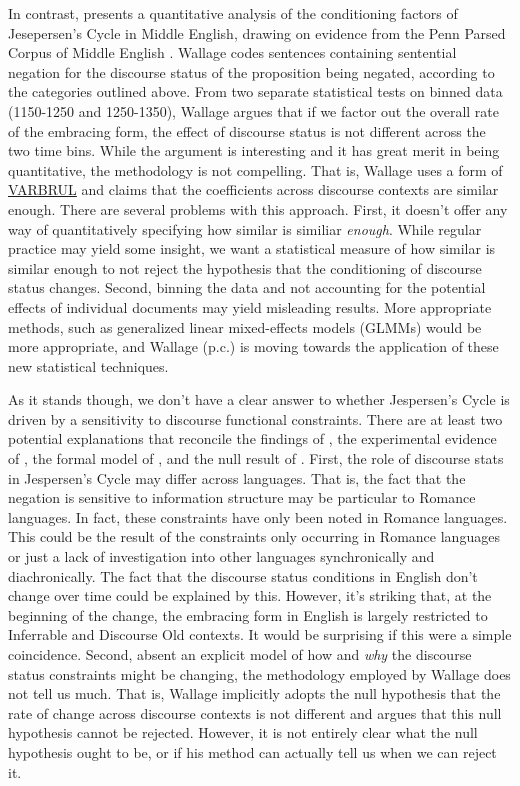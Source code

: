 In contrast, \cite{wallage2013} presents a quantitative analysis of the conditioning factors of Jesepersen's Cycle in Middle English, drawing on evidence from the Penn Parsed Corpus of Middle English \citep{ppcme2}. Wallage codes sentences containing sentential negation for the discourse status of the proposition being negated, according to the categories outlined above. From two separate statistical tests on binned data (1150-1250 and 1250-1350), Wallage argues that if we factor out the overall rate of the embracing form, the effect of discourse status is not different across the two time bins. While the argument is interesting and it has great merit in being quantitative, the methodology is not compelling. That is, Wallage uses a form of \href{http://en.wikipedia.org/wiki/Variable_rules_analysis}{VARBRUL} and claims that the coefficients across discourse contexts are similar enough. There are several problems with this approach. First, it doesn't offer any way of quantitatively specifying how similar is 
similiar \emph{enough}. While regular practice may yield some insight, we want a statistical measure of how similar is similar enough to not reject the hypothesis that the conditioning of discourse status changes. Second, binning the data and not accounting for the potential effects of individual documents may yield misleading results. More appropriate methods, such as generalized linear mixed-effects models (GLMMs) would be more appropriate, and Wallage (p.c.) is moving towards the application of these new statistical techniques.

As it stands though, we don't have a clear answer to whether Jespersen's Cycle is driven by a sensitivity to discourse functional constraints. There are at least two potential explanations that reconcile the findings of \cite{hansen2009, hansen-visconti2009}, the experimental evidence of \cite{lane-etal2006}, the formal model of \cite{ahern-clark2015}, and the null result of \cite{wallage2013}. First, the role of discourse stats in Jespersen's Cycle may differ across languages. That is, the fact that the negation is sensitive to information structure may be particular to Romance languages. In fact, these constraints have only been noted in Romance languages. This could be the result of the constraints only occurring in Romance languages or just a lack of investigation into other languages synchronically and diachronically. The fact that the discourse status conditions in English don't change over time could be explained by this. However, it's striking that, at the beginning of the change, the embracing form 
in English is largely restricted to Inferrable and Discourse Old contexts. It would be surprising if this were a simple coincidence. Second, absent an explicit model of how and \emph{why} the discourse status constraints might be changing, the methodology employed by Wallage does not tell us much. That is, Wallage implicitly adopts the null hypothesis that the rate of change across discourse contexts is not different and argues that this null hypothesis cannot be rejected. However, it is not entirely clear what the null hypothesis ought to be, or if his method can actually tell us when we can reject it.

